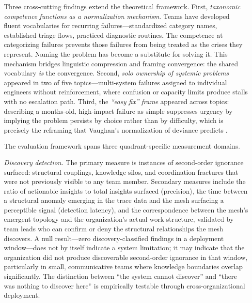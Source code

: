 \documentclass[11pt,a4paper]{article}
\begin{document}
Three cross-cutting findings extend the theoretical framework. First, \emph{taxonomic competence functions as a normalization mechanism}. Teams have developed fluent vocabularies for recurring failures---standardized category names, established triage flows, practiced diagnostic routines. The competence at categorizing failures prevents those failures from being treated as the crises they represent. Naming the problem has become a substitute for solving it. This mechanism bridges linguistic compression and framing convergence: the shared vocabulary \emph{is} the convergence. Second, \emph{solo ownership of systemic problems} appeared in two of five topics---multi-system failures assigned to individual engineers without reinforcement, where confusion or capacity limits produce stalls with no escalation path. Third, the \emph{``easy fix'' frame} appeared across topics: describing a months-old, high-impact failure as simple suppresses urgency by implying the problem persists by choice rather than by difficulty, which is precisely the reframing that Vaughan's normalization of deviance predicts \citep{vaughan1996}.

The evaluation framework spans three quadrant-specific measurement domains.

\emph{Discovery detection.} The primary measure is instances of second-order ignorance surfaced: structural couplings, knowledge silos, and coordination fractures that were not previously visible to any team member. Secondary measures include the ratio of actionable insights to total insights surfaced (precision), the time between a structural anomaly emerging in the trace data and the mesh surfacing a perceptible signal (detection latency), and the correspondence between the mesh's emergent topology and the organization's actual work structure, validated by team leads who can confirm or deny the structural relationships the mesh discovers. A null result---zero discovery-classified findings in a deployment window---does not by itself indicate a system limitation; it may indicate that the organization did not produce discoverable second-order ignorance in that window, particularly in small, communicative teams where knowledge boundaries overlap significantly. The distinction between ``the system cannot discover'' and ``there was nothing to discover here'' is empirically testable through cross-organizational deployment.
\end{document}
